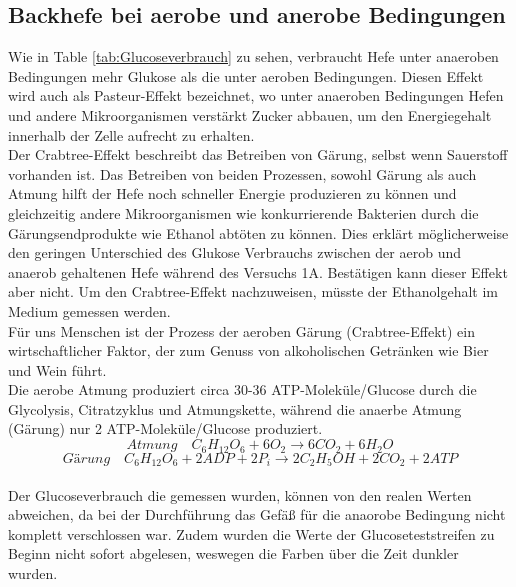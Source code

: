 \documentclass[10pt,a4paper]{article}
\begin{document}
	\subsection{Backhefe bei aerobe und anerobe Bedingungen}
		Wie in Table \ref{tab:Glucoseverbrauch} zu sehen, verbraucht Hefe unter anaeroben Bedingungen mehr Glukose als die unter aeroben Bedingungen. Diesen Effekt wird auch als Pasteur-Effekt bezeichnet, wo unter anaeroben Bedingungen Hefen und andere Mikroorganismen verstärkt Zucker abbauen, um den Energiegehalt innerhalb der Zelle aufrecht zu erhalten. \\
		Der Crabtree-Effekt beschreibt das Betreiben von Gärung, selbst wenn Sauerstoff vorhanden ist. Das Betreiben von beiden Prozessen, sowohl Gärung als auch Atmung hilft der Hefe noch schneller Energie produzieren zu können und gleichzeitig andere Mikroorganismen wie konkurrierende Bakterien durch die Gärungsendprodukte wie Ethanol abtöten zu können. Dies erklärt möglicherweise den geringen Unterschied des Glukose Verbrauchs zwischen der aerob und anaerob gehaltenen Hefe während des Versuchs 1A. Bestätigen kann dieser Effekt aber nicht. Um den Crabtree-Effekt nachzuweisen, müsste der Ethanolgehalt im Medium gemessen werden.\\
		Für uns Menschen ist der Prozess der aeroben Gärung (Crabtree-Effekt) ein wirtschaftlicher Faktor, der zum Genuss von alkoholischen Getränken wie Bier und Wein führt.\\
		Die aerobe Atmung produziert circa 30-36 ATP-Moleküle/Glucose durch die Glycolysis, Citratzyklus und Atmungskette, während die anaerbe Atmung (Gärung) nur 2 ATP-Moleküle/Glucose produziert.\\
		
		\begin{equation}\nonumber
			Atmung \quad C_6H_{12}O_6 + 6 O_2 \rightarrow 6 CO_2 + 6 H_2O
		\end{equation}
		\begin{equation}\nonumber
			Gärung \quad C_6H_{12}O_6 + 2 ADP + 2P_i \rightarrow 2 C_2H_5OH + 2 CO_2 + 2 ATP
		\end{equation}
	\\
		Der Glucoseverbrauch die gemessen wurden, können von den realen Werten abweichen, da bei der Durchführung das Gefäß für die anaorobe Bedingung nicht komplett verschlossen war. Zudem wurden die Werte der Glucoseteststreifen zu Beginn nicht sofort abgelesen, weswegen die Farben über die Zeit dunkler wurden.
		
		
\end{document}
